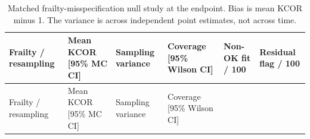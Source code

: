 \documentclass[
]{article}
\begin{document}
\newpage

\begin{longtable}[]{@{}
  >{\raggedright\arraybackslash}p{}
  >{\raggedleft\arraybackslash}p{}
  >{\raggedleft\arraybackslash}p{}
  >{\raggedleft\arraybackslash}p{}
  >{\raggedleft\arraybackslash}p{}
  >{\raggedleft\arraybackslash}p{}@{}}
\caption{Matched frailty-misspecification null study at the endpoint. Bias is mean KCOR minus 1. The variance is across independent point estimates, not across time.}\label{tbl:si_misspecification}\tabularnewline
\toprule\noalign{}
\begin{minipage}[b]{\linewidth}\raggedright
Frailty / resampling
\end{minipage} & \begin{minipage}[b]{\linewidth}\raggedleft
Mean KCOR {[}95\% MC CI{]}
\end{minipage} & \begin{minipage}[b]{\linewidth}\raggedleft
Sampling variance
\end{minipage} & \begin{minipage}[b]{\linewidth}\raggedleft
Coverage {[}95\% Wilson CI{]}
\end{minipage} & \begin{minipage}[b]{\linewidth}\raggedleft
Non-OK fit / 100
\end{minipage} & \begin{minipage}[b]{\linewidth}\raggedleft
Residual flag / 100
\end{minipage} \\
\midrule\noalign{}
\endfirsthead
\toprule\noalign{}
\begin{minipage}[b]{\linewidth}\raggedright
Frailty / resampling
\end{minipage} & \begin{minipage}[b]{\linewidth}\raggedleft
Mean KCOR {[}95\% MC CI{]}
\end{minipage} & \begin{minipage}[b]{\linewidth}\raggedleft
Sampling variance
\end{minipage} & \begin{minipage}[b]{\linewidth}\raggedleft
Coverage {[}95\% Wilson CI{]}
\end{minipage} & \begin{minipage}[b]{\linewidth}\raggedleft

\end{minipage}
\end{longtable}
\end{document}

